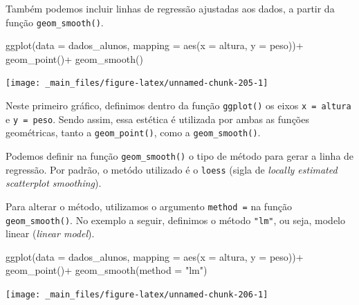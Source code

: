 \documentclass[
  brazilian,
]{book}
\newenvironment{Shaded}{\begin{snugshade}}{\end{snugshade}}
\newcommand{\AttributeTok}[1]{\textcolor[rgb]{0.77,0.63,0.00}{#1}}
\newcommand{\FunctionTok}[1]{\textcolor[rgb]{0.00,0.00,0.00}{#1}}
\newcommand{\NormalTok}[1]{#1}
\newcommand{\SpecialCharTok}[1]{\textcolor[rgb]{0.00,0.00,0.00}{#1}}
\newcommand{\StringTok}[1]{\textcolor[rgb]{0.31,0.60,0.02}{#1}}
\begin{document}
Também podemos incluir linhas de regressão ajustadas aos dados, a partir da função \texttt{geom\_smooth()}.

\begin{Shaded}
\begin{Highlighting}[]
\FunctionTok{ggplot}\NormalTok{(}\AttributeTok{data =}\NormalTok{ dados\_alunos,}
       \AttributeTok{mapping =} \FunctionTok{aes}\NormalTok{(}\AttributeTok{x =}\NormalTok{ altura,}
                     \AttributeTok{y =}\NormalTok{ peso))}\SpecialCharTok{+}
  \FunctionTok{geom\_point}\NormalTok{()}\SpecialCharTok{+}
  \FunctionTok{geom\_smooth}\NormalTok{()}
\end{Highlighting}
\end{Shaded}

\begin{center}\texttt{[image: \_main\_files/figure-latex/unnamed-chunk-205-1]} \end{center}

Neste primeiro gráfico, definimos dentro da função \texttt{ggplot()} os eixos \texttt{x\ =\ altura} e \texttt{y\ =\ peso}. Sendo assim, essa estética é utilizada por ambas as funções geométricas, tanto a \texttt{geom\_point()}, como a \texttt{geom\_smooth()}.

Podemos definir na função \texttt{geom\_smooth()} o tipo de método para gerar a linha de regressão. Por padrão, o metódo utilizado é o \texttt{loess} (sigla de \emph{locally estimated scatterplot smoothing}).

Para alterar o método, utilizamos o argumento \texttt{method\ =} na função \texttt{geom\_smooth()}. No exemplo a seguir, definimos o método \texttt{"lm"}, ou seja, modelo linear (\emph{linear model}).

\begin{Shaded}
\begin{Highlighting}[]
\FunctionTok{ggplot}\NormalTok{(}\AttributeTok{data =}\NormalTok{ dados\_alunos,}
       \AttributeTok{mapping =} \FunctionTok{aes}\NormalTok{(}\AttributeTok{x =}\NormalTok{ altura,}
                     \AttributeTok{y =}\NormalTok{ peso))}\SpecialCharTok{+}
  \FunctionTok{geom\_point}\NormalTok{()}\SpecialCharTok{+}
  \FunctionTok{geom\_smooth}\NormalTok{(}\AttributeTok{method =} \StringTok{"lm"}\NormalTok{)}
\end{Highlighting}
\end{Shaded}

\begin{center}\texttt{[image: \_main\_files/figure-latex/unnamed-chunk-206-1]} \end{center}
\end{document}
